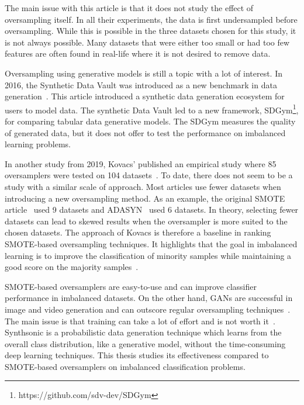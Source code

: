 The main issue with this article is that it does not study the effect of oversampling itself. In all their experiments, the data is first undersampled before oversampling. While this is possible in the three datasets chosen for this study, it is not always possible. Many datasets that were either too small or had too few features are often found in real-life where it is not desired to remove data. 

Oversampling using generative models is still a topic with a lot of interest. In 2016, the Synthetic Data Vault was introduced as a new benchmark in data generation~\cite{Patki2016TheVault}. This article introduced a synthetic data generation ecosystem for users to model data. The synthetic Data Vault led to a new framework, SDGym\footnote{https://github.com/sdv-dev/SDGym}, for comparing tabular data generative models. The SDGym measures the quality of generated data, but it does not offer to test the performance on imbalanced learning problems.

In another study from 2019, Kovacs' published an empirical study where 85 oversamplers were tested on 104 datasets~\cite{Kovacs2019AnDatasets}. To date, there does not seem to be a study with a similar scale of approach. Most articles use fewer datasets when introducing a new oversampling method. As an example, the original SMOTE article~\cite{Chawla2002SMOTE:Technique} used 9 datasets and ADASYN~\cite{He2008ADASYN:Learning} used 6 datasets. In theory, selecting fewer datasets can lead to skewed results when the oversampler is more suited to the chosen datasets. The approach of Kovacs is therefore a baseline in ranking SMOTE-based oversampling techniques. It highlights that the goal in imbalanced learning is to improve the classification of minority samples while maintaining a good score on the majority samples~\cite{Fernandez2018LearningSets}. 

SMOTE-based oversamplers are easy-to-use and can improve classifier performance in imbalanced datasets. On the other hand, GANs are successful in image and video generation and can outscore regular oversampling techniques~\cite{Douzas2018EffectiveNetworks}. The main issue is that training can take a lot of effort and is not worth it~\cite{Camino2020OversamplingEffort}. Synthsonic is a probabilistic data generation technique which learns from the overall class distribution, like a generative model, without the time-consuming deep learning techniques. This thesis studies its effectiveness compared to SMOTE-based oversamplers on imbalanced classification problems.